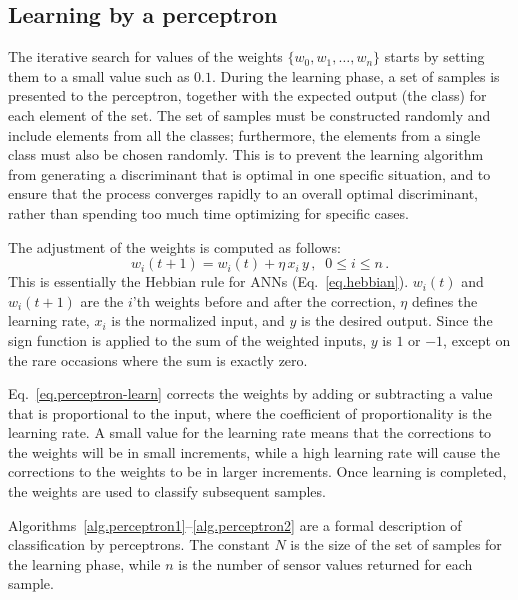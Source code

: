\subsection{Learning by a perceptron}

The iterative search for values of the weights $\{w_0,w_1,\ldots,w_n\}$ starts by setting them to a small value such as $0.1$. During the learning phase, a set of samples is presented to the perceptron, together with the expected output (the class) for each element of the set. The set of samples must be constructed randomly and include elements from all the classes; furthermore, the elements from a single class must also be chosen randomly. This is to prevent the learning algorithm from generating a discriminant that is optimal in one specific situation, and to ensure that the process converges rapidly to an overall optimal discriminant, rather than spending too much time optimizing for specific cases.

The adjustment of the weights is computed as follows:
\begin{equation}
w_i(t+1) = w_i(t) + \eta \,x_i \,y\,,\;\;0\leq i \leq n\,.\label{eq.perceptron-learn}
\end{equation}
This is essentially the Hebbian rule for ANNs (Eq.~\ref{eq.hebbian}). $w_i(t)$ and $w_i(t+1)$ are the $i$'th weights before and after the correction, $\eta$ defines the learning rate, $x_i$ is the normalized input, and $y$ is the desired output. Since the sign function is applied to the sum of the weighted inputs, $y$ is $1$ or $-1$, except on the rare occasions where the sum is exactly zero. 

Eq.~\ref{eq.perceptron-learn} corrects the weights by adding or subtracting a value that is proportional to the input, where the coefficient of proportionality is the learning rate. A small value for the learning rate means that the corrections to the weights will be in small increments, while a high learning rate will cause the corrections to the weights to be in larger increments. Once learning is completed, the weights are used to classify subsequent samples.

Algorithms~\ref{alg.perceptron1}--\ref{alg.perceptron2} are a formal description of classification by perceptrons. The constant $N$ is the size of the set of samples for the learning phase, while $n$ is the number of sensor values returned for each sample.

